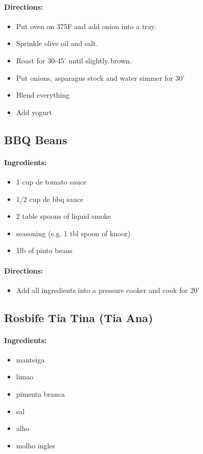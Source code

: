 \documentclass{article}
\begin{document}
\paragraph{Directions:}
\begin{itemize}
    \item Put oven on 375F and add onion into a tray.
    \item Sprinkle olive oil and salt.
    \item Roast for 30-45' until slightly brown.
    \item Put onions, asparagus stock and water simmer for 30'
    \item Blend everything
    \item Add yogurt
\end{itemize}

\subsection{BBQ Beans}

\paragraph{Ingredients:}
\begin{itemize}
    \item 1 cup de tomato sauce
    \item 1/2 cup de bbq sauce
    \item 2 table spoons of liquid smoke
    \item seasoning (e.g. 1 tbl spoon of knoor)
    \item 1lb of pinto beans
\end{itemize}

\paragraph{Directions:}
\begin{itemize}
    \item Add all ingredients into a pressure cooker and cook for 20'
\end{itemize}

\subsection{Rosbife Tia Tina (Tia Ana)}

\paragraph{Ingredients:}
\begin{itemize}
    \item manteiga
    \item limao
    \item pimenta branca
    \item sal
    \item alho
    \item molho ingles
\end{itemize}
\end{document}
